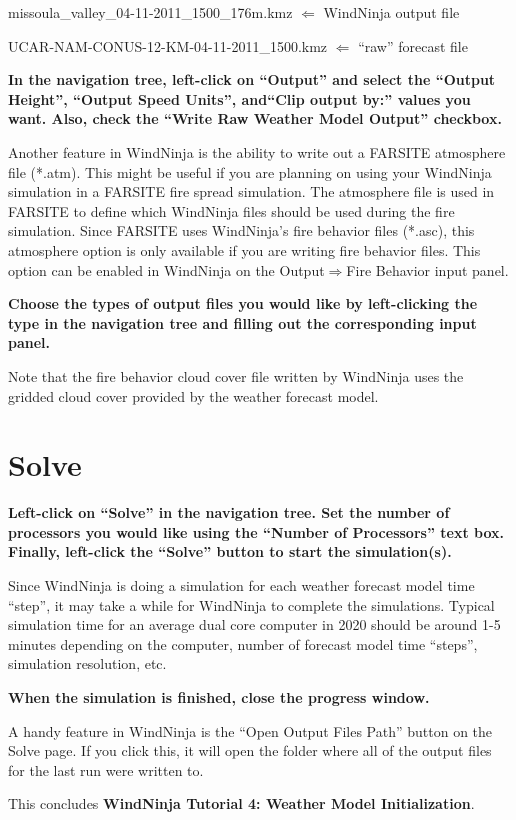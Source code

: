 \documentclass[12pt]{article}
\begin{document}
missoula\_valley\_04-11-2011\_1500\_176m.kmz $\Leftarrow$ WindNinja output file

UCAR-NAM-CONUS-12-KM-04-11-2011\_1500.kmz  $\Leftarrow$  “raw” forecast file

\textbf{\color{red} In the navigation tree, left-click on “Output” and select the “Output Height”, “Output Speed Units”, and“Clip output by:” values you want.  Also, check the “Write Raw Weather Model Output” checkbox.}

Another feature in WindNinja is the ability to write out a FARSITE atmosphere file (*.atm).  This might be useful if you are planning on using your WindNinja simulation in a FARSITE fire spread simulation.  The atmosphere file is used in FARSITE to define which WindNinja files should be used during the fire simulation.  Since FARSITE uses WindNinja's fire behavior files (*.asc), this atmosphere option is only available if you are writing fire behavior files.  This option can be enabled in WindNinja on the Output$\Rightarrow$Fire Behavior input panel.

\textbf{\color{red}Choose the types of output files you would like by left-clicking the type in the navigation tree and filling out the corresponding input panel.}

Note that the fire behavior cloud cover file written by WindNinja uses the gridded cloud cover provided by the weather forecast model.

\section{Solve}

\textbf{\color{red} Left-click on “Solve” in the navigation tree.  Set the number of processors you would like using the “Number of Processors” text box.  Finally, left-click the “Solve” button to start the simulation(s).}

Since WindNinja is doing a simulation for each weather forecast model time “step”, it may take a while for WindNinja to complete the simulations.  Typical simulation time for an average dual core computer in 2020 should be around 1-5 minutes depending on the computer, number of forecast model time “steps”, simulation resolution, etc.

\textbf{\color{red} When the simulation is finished, close the progress window.}

A handy feature in WindNinja is the “Open Output Files Path” button on the Solve page.  If you click this, it will open the folder where all of the output files for the last run were written to.

This concludes \textbf{WindNinja Tutorial 4: Weather Model Initialization}.
\end{document}
